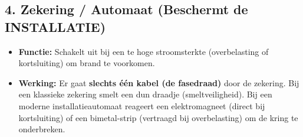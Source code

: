 \documentclass[a4paper, 11pt]{article}
\begin{document}
\subsection{4. Zekering / Automaat (Beschermt de INSTALLATIE)}
\begin{itemize}
    \item \textbf{Functie:} Schakelt uit bij een te hoge stroomsterkte (overbelasting of kortsluiting) om brand te voorkomen.
    \item \textbf{Werking:} Er gaat \textbf{slechts één kabel (de fasedraad)} door de zekering. Bij een klassieke zekering smelt een dun draadje (smeltveiligheid). Bij een moderne installatieautomaat reageert een elektromagneet (direct bij kortsluiting) of een bimetal-strip (vertraagd bij overbelasting) om de kring te onderbreken.
\end{itemize}
\end{document}
